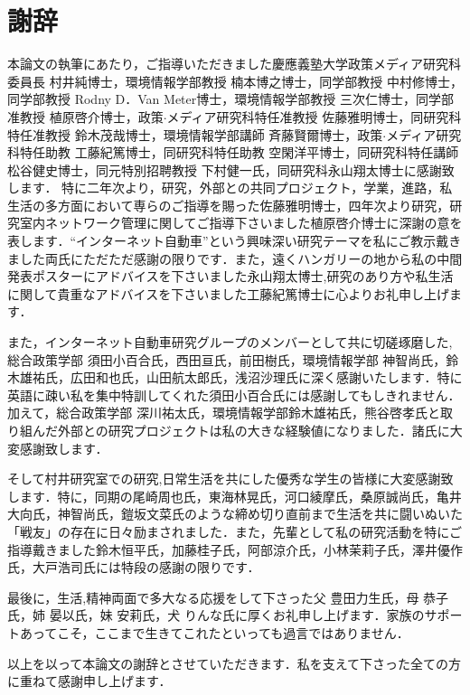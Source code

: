 
\chapter*{謝辞}

本論文の執筆にあたり，ご指導いただきました慶應義塾大学政策メディア研究科委員長 村井純博士，環境情報学部教授 楠本博之博士，同学部教授 中村修博士，同学部教授 Rodny D．Van Meter博士，環境情報学部教授 三次仁博士，同学部准教授 植原啓介博士，政策$\cdot$メディア研究科特任准教授 佐藤雅明博士，同研究科特任准教授 鈴木茂哉博士，環境情報学部講師 斉藤賢爾博士，政策$\cdot$メディア研究科特任助教 工藤紀篤博士，同研究科特任助教 空閑洋平博士，同研究科特任講師 松谷健史博士，同元特別招聘教授 下村健一氏，同研究科永山翔太博士に感謝致します．
特に二年次より，研究，外部との共同プロジェクト，学業，進路，私生活の多方面において専らのご指導を賜った佐藤雅明博士，四年次より研究，研究室内ネットワーク管理に関してご指導下さいました植原啓介博士に深謝の意を表します．``インターネット自動車''という興味深い研究テーマを私にご教示戴きました両氏にただただ感謝の限りです．また，遠くハンガリーの地から私の中間発表ポスターにアドバイスを下さいました永山翔太博士,研究のあり方や私生活に関して貴重なアドバイスを下さいました工藤紀篤博士に心よりお礼申し上げます．


また，インターネット自動車研究グループのメンバーとして共に切磋琢磨した,総合政策学部 須田小百合氏，西田亘氏，前田樹氏，環境情報学部 神智尚氏，鈴木雄祐氏，広田和也氏，山田航太郎氏，浅沼沙理氏に深く感謝いたします．特に英語に疎い私を集中特訓してくれた須田小百合氏には感謝してもしきれません．加えて，総合政策学部 深川祐太氏，環境情報学部鈴木雄祐氏，熊谷啓孝氏と取り組んだ外部との研究プロジェクトは私の大きな経験値になりました．諸氏に大変感謝致します．


そして村井研究室での研究,日常生活を共にした優秀な学生の皆様に大変感謝致します．特に，同期の尾崎周也氏，東海林晃氏，河口綾摩氏，桑原誠尚氏，亀井大向氏，神智尚氏，鎧坂文菜氏のような締め切り直前まで生活を共に闘いぬいた「戦友」の存在に日々励まされました．また，先輩として私の研究活動を特にご指導戴きました鈴木恒平氏，加藤桂子氏，阿部涼介氏，小林茉莉子氏，澤井優作氏，大戸浩司氏には特段の感謝の限りです．


最後に，生活,精神両面で多大なる応援をして下さった父 豊田力生氏，母 恭子氏，姉 晏以氏，妹 安莉氏，犬 りんな氏に厚くお礼申し上げます．家族のサポートあってこそ，ここまで生きてこれたといっても過言ではありません．

以上を以って本論文の謝辞とさせていただきます．私を支えて下さった全ての方に重ねて感謝申し上げます．